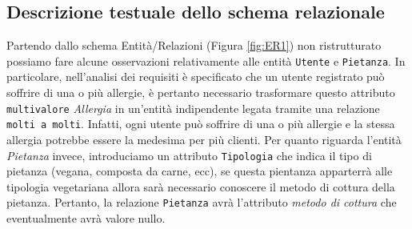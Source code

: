 \documentclass[10pt]{article}
\begin{document}
		\subsection{Descrizione testuale dello schema relazionale}
Partendo dallo schema Entità/Relazioni (Figura \ref{fig:ER1}) non ristrutturato possiamo fare alcune osservazioni relativamente alle entità \texttt{Utente} e \texttt{Pietanza}. In particolare, nell'analisi dei requisiti \`e specificato che un utente registrato pu\`o soffrire di una o pi\`u allergie, \`e pertanto necessario trasformare questo attributo \texttt{multivalore} \textit{Allergia} in un'entit\`a indipendente legata tramite una relazione \texttt{molti a molti}. Infatti, ogni utente pu\`o soffrire di una o pi\`u allergie e la stessa allergia potrebbe essere la medesima per pi\`u clienti. Per quanto riguarda l'entit\`a \textit{Pietanza} invece, introduciamo un attributo \texttt{Tipologia} che indica il tipo di pietanza (vegana, composta da carne, ecc), se questa pientanza apparterrà alle tipologia vegetariana allora sarà necessario conoscere il metodo di cottura della pietanza. Pertanto, la relazione \texttt{Pietanza} avr\`a l'attributo \textit{metodo di cottura} che eventualmente avr\`a valore nullo.  
\end{document}
